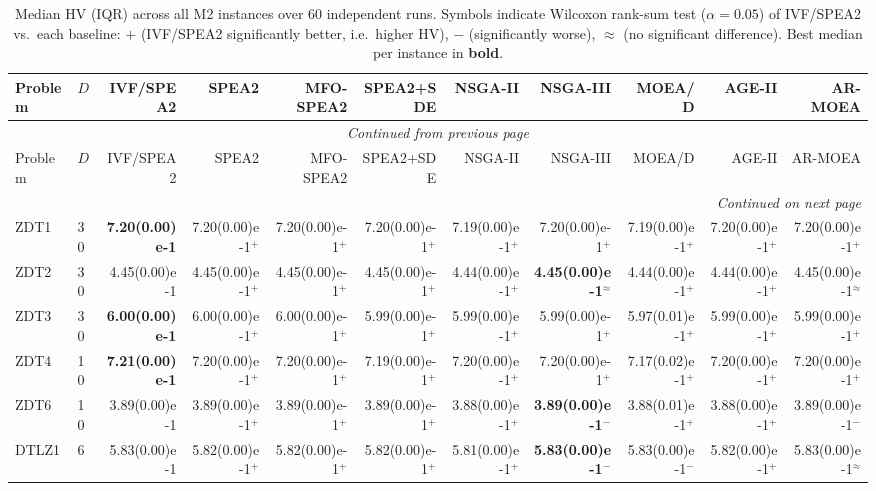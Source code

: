 \begin{longtable}{llrrrrrrrrr}
\caption{Median HV (IQR) across all M2 instances over 60 independent runs. Symbols indicate Wilcoxon rank-sum test ($\alpha=0.05$) of IVF/SPEA2 vs.\ each baseline: $+$ (IVF/SPEA2 significantly better, i.e.\ higher HV), $-$ (significantly worse), $\approx$ (no significant difference). Best median per instance in \textbf{bold}.}
\label{tab:hv_per_instance_m2}\\
\toprule
Problem & $D$ & IVF/SPEA2 & SPEA2 & MFO-SPEA2 & SPEA2+SDE & NSGA-II & NSGA-III & MOEA/D & AGE-II & AR-MOEA \\
\midrule
\endfirsthead
\multicolumn{11}{c}{{\textit{Continued from previous page}}} \\
\toprule
Problem & $D$ & IVF/SPEA2 & SPEA2 & MFO-SPEA2 & SPEA2+SDE & NSGA-II & NSGA-III & MOEA/D & AGE-II & AR-MOEA \\
\midrule
\endhead
\midrule
\multicolumn{11}{r}{{\textit{Continued on next page}}} \\
\endfoot
\botrule
\endlastfoot
ZDT1 & 30 & \textbf{7.20(0.00)e-1} & 7.20(0.00)e-1$^{+}$ & 7.20(0.00)e-1$^{+}$ & 7.20(0.00)e-1$^{+}$ & 7.19(0.00)e-1$^{+}$ & 7.20(0.00)e-1$^{+}$ & 7.19(0.00)e-1$^{+}$ & 7.20(0.00)e-1$^{+}$ & 7.20(0.00)e-1$^{+}$ \\
ZDT2 & 30 & 4.45(0.00)e-1 & 4.45(0.00)e-1$^{+}$ & 4.45(0.00)e-1$^{+}$ & 4.45(0.00)e-1$^{+}$ & 4.44(0.00)e-1$^{+}$ & \textbf{4.45(0.00)e-1}$^{\approx}$ & 4.44(0.00)e-1$^{+}$ & 4.44(0.00)e-1$^{+}$ & 4.45(0.00)e-1$^{\approx}$ \\
ZDT3 & 30 & \textbf{6.00(0.00)e-1} & 6.00(0.00)e-1$^{+}$ & 6.00(0.00)e-1$^{+}$ & 5.99(0.00)e-1$^{+}$ & 5.99(0.00)e-1$^{+}$ & 5.99(0.00)e-1$^{+}$ & 5.97(0.01)e-1$^{+}$ & 5.99(0.00)e-1$^{+}$ & 5.99(0.00)e-1$^{+}$ \\
ZDT4 & 10 & \textbf{7.21(0.00)e-1} & 7.20(0.00)e-1$^{+}$ & 7.20(0.00)e-1$^{+}$ & 7.19(0.00)e-1$^{+}$ & 7.20(0.00)e-1$^{+}$ & 7.20(0.00)e-1$^{+}$ & 7.17(0.02)e-1$^{+}$ & 7.20(0.00)e-1$^{+}$ & 7.20(0.00)e-1$^{+}$ \\
ZDT6 & 10 & 3.89(0.00)e-1 & 3.89(0.00)e-1$^{+}$ & 3.89(0.00)e-1$^{+}$ & 3.89(0.00)e-1$^{+}$ & 3.88(0.00)e-1$^{+}$ & \textbf{3.89(0.00)e-1}$^{-}$ & 3.88(0.01)e-1$^{+}$ & 3.88(0.00)e-1$^{+}$ & 3.89(0.00)e-1$^{-}$ \\
\midrule
DTLZ1 & 6 & 5.83(0.00)e-1 & 5.82(0.00)e-1$^{+}$ & 5.82(0.00)e-1$^{+}$ & 5.82(0.00)e-1$^{+}$ & 5.81(0.00)e-1$^{+}$ & \textbf{5.83(0.00)e-1}$^{-}$ & 5.83(0.00)e-1$^{-}$ & 5.82(0.00)e-1$^{+}$ & 5.83(0.00)e-1$^{\approx}$ \\

\end{longtable}
